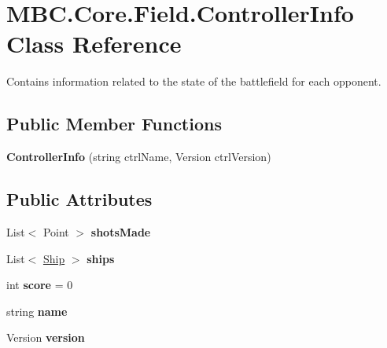 \hypertarget{class_m_b_c_1_1_core_1_1_field_1_1_controller_info}{\section{M\-B\-C.\-Core.\-Field.\-Controller\-Info Class Reference}
\label{class_m_b_c_1_1_core_1_1_field_1_1_controller_info}
}


Contains information related to the state of the battlefield for each opponent. 


\subsection*{Public Member Functions}
\begin{DoxyCompactItemize}
\item 
\hypertarget{class_m_b_c_1_1_core_1_1_field_1_1_controller_info_a86a3a39e847075369e6c08e19fad356c}{{\bfseries Controller\-Info} (string ctrl\-Name, Version ctrl\-Version)}\label{class_m_b_c_1_1_core_1_1_field_1_1_controller_info_a86a3a39e847075369e6c08e19fad356c}

\end{DoxyCompactItemize}
\subsection*{Public Attributes}
\begin{DoxyCompactItemize}
\item 
\hypertarget{class_m_b_c_1_1_core_1_1_field_1_1_controller_info_a0e47d7ccd7030340d6b8cb7691bd3d93}{List$<$ Point $>$ {\bfseries shots\-Made}}\label{class_m_b_c_1_1_core_1_1_field_1_1_controller_info_a0e47d7ccd7030340d6b8cb7691bd3d93}

\item 
\hypertarget{class_m_b_c_1_1_core_1_1_field_1_1_controller_info_a6d69c3ee13b7f5779921afc37582d5e1}{List$<$ \hyperlink{class_m_b_c_1_1_core_1_1_ship}{Ship} $>$ {\bfseries ships}}\label{class_m_b_c_1_1_core_1_1_field_1_1_controller_info_a6d69c3ee13b7f5779921afc37582d5e1}

\item 
\hypertarget{class_m_b_c_1_1_core_1_1_field_1_1_controller_info_a04bdad238fa4cc5793a332019760d69f}{int {\bfseries score} = 0}\label{class_m_b_c_1_1_core_1_1_field_1_1_controller_info_a04bdad238fa4cc5793a332019760d69f}

\item 
\hypertarget{class_m_b_c_1_1_core_1_1_field_1_1_controller_info_a0cfcf1cf1be00aff816e54fae75acdfe}{string {\bfseries name}}\label{class_m_b_c_1_1_core_1_1_field_1_1_controller_info_a0cfcf1cf1be00aff816e54fae75acdfe}

\item 
\hypertarget{class_m_b_c_1_1_core_1_1_field_1_1_controller_info_a68c36e4d0a3344408794caf64f6f7a10}{Version {\bfseries version}}\label{class_m_b_c_1_1_core_1_1_field_1_1_controller_info_a68c36e4d0a3344408794caf64f6f7a10}

\end{DoxyCompactItemize}


